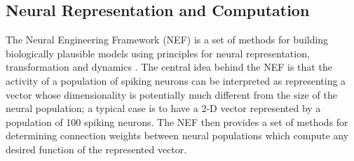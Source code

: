 \documentclass[10pt,letterpaper]{article}
\begin{document}
\subsection{Neural Representation and Computation}
The Neural Engineering Framework (NEF) is a set of methods for building biologically
plausible models using principles for neural representation, transformation and dynamics \citep{Eliasmith2003m}. 
The central idea behind the NEF is that the activity of a population of spiking neurons can be interpreted as representing a vector whose dimensionality is potentially much different from the size of the neural population; a typical case is to have a 2-D vector represented by a population of 100 spiking neurons. The NEF then provides a set of methods for determining connection weights between neural populations which compute any desired function of the represented vector.
\end{document}
